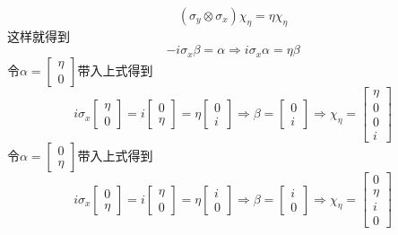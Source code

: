 \documentclass{article}
\numberwithin{equation}{subsection}
\begin{document}
\begin{equation}
    (\sigma_y\otimes\sigma_x)\chi_\eta=\eta\chi_\eta
\end{equation}
这样就得到
\begin{equation}
    -i\sigma_x\beta=\alpha\Longrightarrow i\sigma_x\alpha=\eta\beta
\end{equation}
令$\alpha=\begin{bmatrix}
    \eta\\
    0
\end{bmatrix}$带入上式得到
\begin{equation}
    i\sigma_x\begin{bmatrix}
        \eta\\
        0
    \end{bmatrix}=i\begin{bmatrix}
        0\\
        \eta
    \end{bmatrix}=\eta\begin{bmatrix}
        0\\
        i
    \end{bmatrix}\Longrightarrow\beta=\begin{bmatrix}
        0\\
        i
    \end{bmatrix}\Longrightarrow\chi_\eta=\begin{bmatrix}
        \eta\\
        0\\
        0\\
        i
    \end{bmatrix}
\end{equation}
令$\alpha=\begin{bmatrix}
    0\\
    \eta
\end{bmatrix}$带入上式得到
\begin{equation}
    i\sigma_x\begin{bmatrix}
        0\\
        \eta
    \end{bmatrix}=i\begin{bmatrix}
        \eta\\
        0
    \end{bmatrix}=\eta\begin{bmatrix}
        i\\
        0
    \end{bmatrix}\Longrightarrow\beta=\begin{bmatrix}
        i\\
        0
    \end{bmatrix}\Longrightarrow\chi_\eta=\begin{bmatrix}
        0\\
        \eta\\
        i\\
        0
    \end{bmatrix}
\end{equation}
\end{document}

